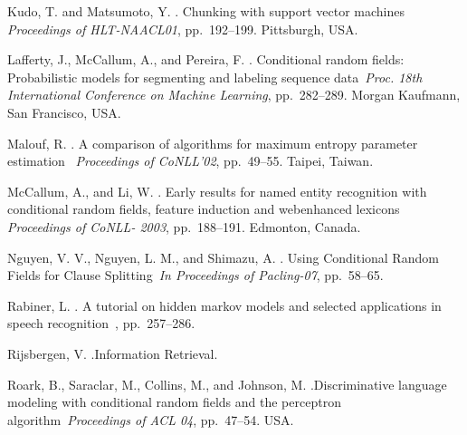 \documentclass[english]{jnlp_1.4}
\begin{document}
{\begin{thebibliography}{}
Kudo, T. and Matsumoto, Y. \BBCP.
\newblock \BBOQ Chunking with support vector machines\BBCQ\ \newblock
{\em Proceedings of HLT-NAACL01}, pp.~192--199. Pittsburgh, USA.

Lafferty, J., McCallum, A., and Pereira, F. \BBCP.
\newblock \BBOQ Conditional random fields: Probabilistic models for segmenting and
labeling sequence data\BBCQ\
\newblock \textit{Proc. 18th International Conference on
Machine Learning}, pp.~282--289. Morgan Kaufmann, San Francisco,
USA.

Malouf, R. \BBCP. \newblock \BBOQ A comparison of
algorithms for maximum entropy parameter estimation\BBCQ\ \newblock
{\em Proceedings of CoNLL'02}, pp.~49--55. Taipei, Taiwan.

McCallum, A., and Li, W. \BBOP 2003\BBCP. \newblock \BBOQ Early
results for named entity recognition with conditional random fields,
feature induction and webenhanced lexicons\BBCQ\ \newblock
\emph{Proceedings of CoNLL- 2003}, pp.~188--191. Edmonton, Canada.


Nguyen, V. V., Nguyen, L. M., and Shimazu, A. \BBOP 2007\BBCP.
\newblock \BBOQ Using Conditional Random Fields for Clause Splitting\BBCQ\
\newblock \textit{In Proceedings of Pacling-07}, pp.~58--65.

Rabiner, L. \BBCP. \newblock \BBOQ A tutorial on hidden
markov models and selected applications in speech recognition\BBCQ\
, pp.~257--286.


Rijsbergen, V. \BBCP.\newblock \BBOQ Information
Retrieval\BBCQ {}.

Roark, B., Saraclar, M., Collins, M., and Johnson, M. \BBCP.\newblock \BBOQ Discriminative language modeling with
conditional random fields and the perceptron algorithm\BBCQ\
\newblock \textit{Proceedings of ACL 04}, pp.~47--54.
USA.


\end{thebibliography}}
\end{document}
